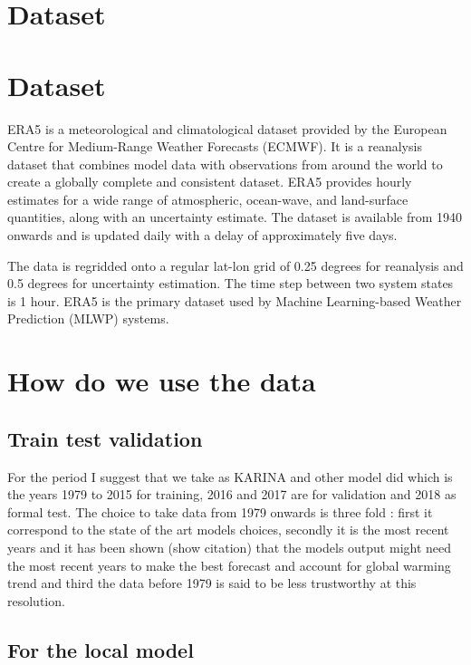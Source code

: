 \section{Dataset}

\section{Dataset}

ERA5 is a meteorological and climatological dataset provided by the European Centre for Medium-Range Weather Forecasts (ECMWF). It is a reanalysis dataset that combines model data with observations from around the world to create a globally complete and consistent dataset. ERA5 provides hourly estimates for a wide range of atmospheric, ocean-wave, and land-surface quantities, along with an uncertainty estimate. The dataset is available from 1940 onwards and is updated daily with a delay of approximately five days. 

The data is regridded onto a regular lat-lon grid of 0.25 degrees for reanalysis and 0.5 degrees for uncertainty estimation. The time step between two system states is 1 hour. ERA5 is the primary dataset used by Machine Learning-based Weather Prediction (MLWP) systems.



\section{How do we use the data}

\subsection{Train test validation}

For the period I suggest that we take as KARINA and other model did which is the years 1979 to 2015 for training, 2016 and 2017 are for validation and 2018 as formal test. The choice to take data from 1979 onwards is three fold : first it correspond to the state of the art models choices, secondly it is the most recent years and it has been shown (show citation) that the models output might need the most recent years to make the best forecast and account for global warming trend and third the data before 1979 is said to be less trustworthy at this resolution.\\

\subsection*{For the local model}

